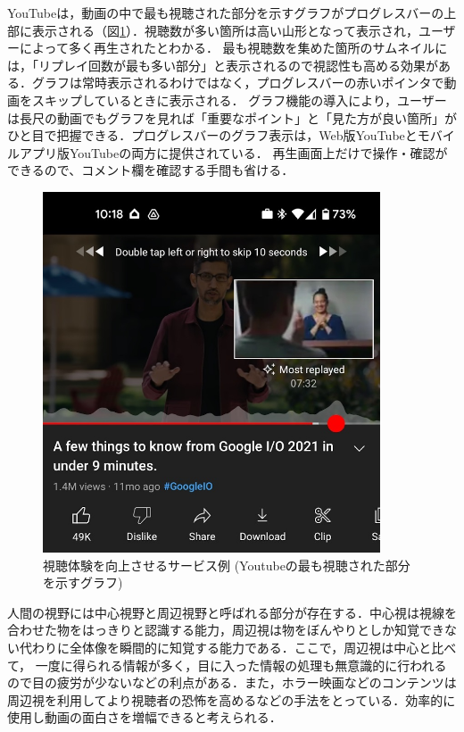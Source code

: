 YouTubeは，動画の中で最も視聴された部分を示すグラフがプログレスバーの上部に表示される（図\ref{youtube}）．視聴数が多い箇所は高い山形となって表示され，ユーザーによって多く再生されたとわかる．
最も視聴数を集めた箇所のサムネイルには，「リプレイ回数が最も多い部分」と表示されるので視認性も高める効果がある．グラフは常時表示されるわけではなく，プログレスバーの赤いポインタで動画をスキップしているときに表示される．
グラフ機能の導入により，ユーザーは長尺の動画でもグラフを見れば「重要なポイント」と「見た方が良い箇所」がひと目で把握できる．プログレスバーのグラフ表示は，Web版YouTubeとモバイルアプリ版YouTubeの両方に提供されている．
再生画面上だけで操作・確認ができるので、コメント欄を確認する手間も省ける．

\begin{figure}[H]
    \centering
    \includegraphics[width=10cm]{images/chapter1/YouTube.jpeg}
    \caption{視聴体験を向上させるサービス例 (Youtubeの最も視聴された部分を示すグラフ)}
    \label{youtube}
\end{figure}

人間の視野には中心視野と周辺視野と呼ばれる部分が存在する．中心視は視線を合わせた物をはっきりと認識する能力，周辺視は物をぼんやりとしか知覚できない代わりに全体像を瞬間的に知覚する能力である．ここで，周辺視は中心と比べて，
一度に得られる情報が多く，目に入った情報の処理も無意識的に行われるので目の疲労が少ないなどの利点がある．また，ホラー映画などのコンテンツは周辺視を利用してより視聴者の恐怖を高めるなどの手法をとっている．効率的に使用し動画の面白さを増幅できると考えられる．

